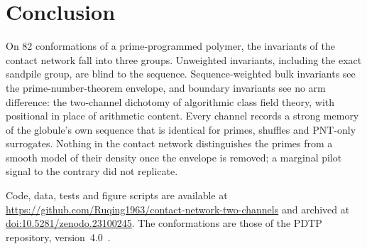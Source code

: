 \documentclass[reprint,amsmath,amssymb,aps,pre,longbibliography]{revtex4-2}
\begin{document}
\section{Conclusion}

On 82 conformations of a prime-programmed polymer, the invariants of the contact network fall into
three groups. Unweighted invariants, including the exact sandpile group, are blind to the
sequence. Sequence-weighted bulk invariants see the prime-number-theorem envelope, and boundary
invariants see no arm difference: the two-channel dichotomy of algorithmic class field theory,
with positional in place of arithmetic content. Every channel records a strong memory of the
globule's own sequence that is identical for primes, shuffles and PNT-only surrogates. Nothing in
the contact network distinguishes the primes from a smooth model of their density once the
envelope is removed; a marginal pilot signal to the contrary did not replicate.

\begin{acknowledgments}
Code, data, tests and figure scripts are available at
\url{https://github.com/Ruqing1963/contact-network-two-channels} and archived at
\href{https://doi.org/10.5281/zenodo.23100245}{doi:10.5281/zenodo.23100245}. The conformations are those of
the PDTP repository, version~4.0~\cite{PDTP4}.
\end{acknowledgments}


\end{document}
